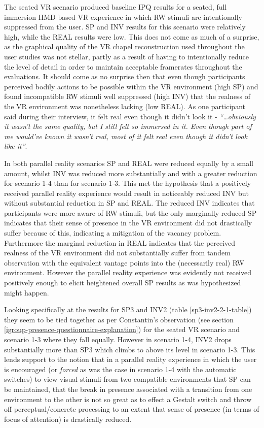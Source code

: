 The seated VR scenario produced baseline IPQ results for a seated, full immersion HMD based VR experience in which RW stimuli are intentionally suppressed from the user. SP and INV results for this scenario were relatively high, while the REAL results were low. This does not come as much of a surprise, as the graphical quality of the VR chapel reconstruction used throughout the user studies was not stellar, partly as a result of having to intentionally reduce the level of detail in order to maintain acceptable framerates throughout the evaluations. It should come as no surprise then that even though participants perceived bodily actions to be possible within the VR environment (high SP) and found incompatible RW stimuli well suppressed (high INV) that the realness of the VR environment was nonetheless lacking (low REAL). As one participant said during their interview, it felt real even though it didn't look it - \textit{``\ldots obviously it wasn't the same quality, but I still felt so immersed in it. Even though part of me would've known it wasn't real, most of it felt real even though it didn't look like it''}.

In both parallel reality scenarios SP and REAL were reduced equally by a small amount, whilst INV was reduced more substantially and with a greater reduction for scenario 1-4 than for scenario 1-3. This met the hypothesis that a positively received parallel reality experience would result in noticeably reduced INV but without substantial reduction in SP and REAL. The reduced INV indicates that participants were more aware of RW stimuli, but the only marginally reduced SP indicates that their sense of presence in the VR environment did not drastically suffer because of this, indicating a mitigation of the vacancy problem. Furthermore the marginal reduction in REAL indicates that the perceived realness of the VR environment did not substantially suffer from tandem observation with the equivalent vantage points into the (necessarily real) RW environment. However the parallel reality experience was evidently not received positively enough to elicit heightened overall SP results as was hypothesized might happen.

Looking specifically at the results for SP3 and INV2 (table \ref{sp3-inv2-2-1-table}) they seem to be tied together as per Constantin's observation (see section \ref{igroup-presence-questionnaire-explanation}) for the seated VR scenario and scenario 1-3 where they fall equally. However in scenario 1-4, INV2 drops substantially more than SP3 which climbs to above its level in scenario 1-3. This lends support to the notion that in a parallel reality experience in which the user is encouraged (or \textit{forced} as was the case in scenario 1-4 with the automatic switches) to view visual stimuli from two compatible environments that SP can be maintained, that the break in presence associated with a transition from one environment to the other is not so great as to effect a Gestalt switch and throw off perceptual/concrete processing to an extent that sense of presence (in terms of focus of attention) is drastically reduced.

